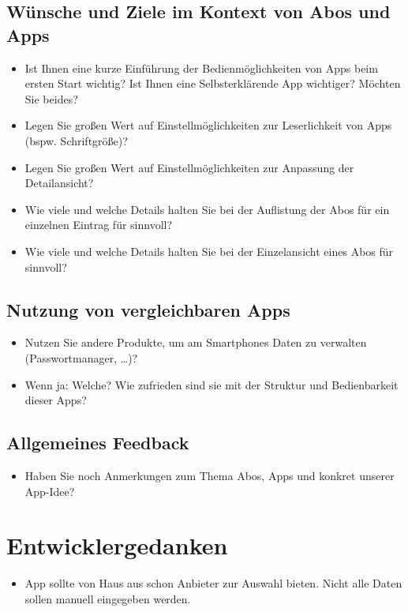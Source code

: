\documentclass{scrartcl}
\begin{document}
\subsection{Wünsche und Ziele im Kontext von Abos und Apps}
\begin{itemize}
\item Ist Ihnen eine kurze Einführung der Bedienmöglichkeiten von Apps beim ersten Start wichtig? Ist Ihnen eine Selbsterklärende App wichtiger? Möchten Sie beides?
\item Legen Sie großen Wert auf Einstellmöglichkeiten zur Leserlichkeit von Apps (bspw. Schriftgröße)? 
\item Legen Sie großen Wert auf Einstellmöglichkeiten zur Anpassung der Detailansicht?
\item Wie viele und welche Details halten Sie bei der Auflistung der Abos für ein einzelnen Eintrag für sinnvoll?
\item Wie viele und welche Details halten Sie bei der Einzelansicht eines Abos für sinnvoll?
\end{itemize}
\subsection{Nutzung von vergleichbaren Apps}
\begin{itemize}
\item Nutzen Sie andere Produkte, um am Smartphones Daten zu verwalten (Passwortmanager, …)?
\item Wenn ja: Welche? Wie zufrieden sind sie mit der Struktur und Bedienbarkeit dieser Apps?
\end{itemize}
\subsection{Allgemeines Feedback}
\begin{itemize}
\item Haben Sie noch Anmerkungen zum Thema Abos, Apps und konkret unserer App-Idee?
\end{itemize}

\section{Entwicklergedanken}
\begin{itemize}
\item App sollte von Haus aus schon Anbieter zur Auswahl bieten. Nicht alle Daten sollen manuell eingegeben werden.
\end{itemize}
\end{document}
